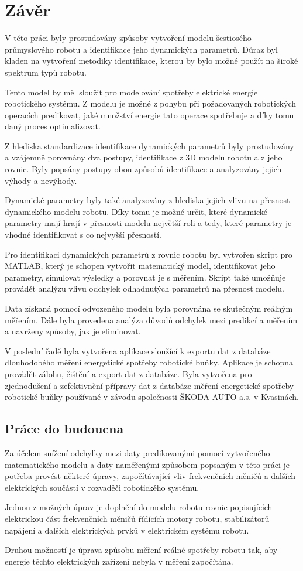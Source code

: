 \chapter{Závěr}

V této práci byly prostudovány způsoby vytvoření modelu šestiosého průmyslového robotu a identifikace jeho dynamických parametrů. Důraz byl kladen na vytvoření metodiky identifikace, kterou by bylo možné použít na široké spektrum typů robotu. 

Tento model by měl sloužit pro modelování spotřeby elektrické energie robotického systému. Z modelu je možné z pohybu při požadovaných robotických operacích predikovat, jaké množství energie tato operace spotřebuje a díky tomu daný proces optimalizovat.

Z hlediska standardizace identifikace dynamických parametrů byly prostudovány a vzájemně porovnány dva postupy, identifikace z 3D modelu robotu a z jeho rovnic. Byly popsány postupy obou způsobů identifikace a analyzovány jejich výhody a nevýhody. 

Dynamické parametry byly také analyzovány z hlediska jejich vlivu na přesnost dynamického modelu robotu. Díky tomu je možné určit, které dynamické parametry mají hrají v přesnosti modelu největší roli a tedy, které parametry je vhodné identifikovat s co nejvyšší přesností.

Pro identifikaci dynamických parametrů z rovnic robotu byl vytvořen skript pro MATLAB, který je schopen vytvořit matematický model, identifikovat jeho parametry, simulovat výsledky a porovnat je s měřením. Skript také umožňuje provádět analýzu vlivu odchylek odhadnutých parametrů na přesnost modelu. 

Data získaná pomocí odvozeného modelu byla porovnána se skutečným reálným měřením. Dále byla provedena analýza důvodů odchylek mezi predikcí a měřením a navrženy způsoby, jak je eliminovat.  

V poslední řadě byla vytvořena aplikace sloužící k exportu dat z databáze dlouhodobého měření energetické spotřeby robotické buňky. Aplikace je schopna provádět zálohu, čištění a export dat z databáze. Byla vytvořena pro zjednodušení a zefektivnění přípravy dat z databáze měření energetické spotřeby robotické buňky používané v závodu společnosti ŠKODA AUTO a.s. v Kvasinách. 

\section{Práce do budoucna}

Za účelem snížení odchylky mezi daty predikovanými pomocí vytvořeného matematického modelu a daty naměřenými způsobem popsaným v této práci je potřeba provést některé úpravy, započítávající vliv frekvenčních měničů a dalších elektrických součástí v rozvaděči robotického systému. 

Jednou z možných úprav je doplnění do modelu robotu rovnic popisujících elektrickou část frekvenčních měničů řídících motory robotu, stabilizátorů napájení a dalších elektrických prvků v elektrickém systému robotu.

Druhou možností je úprava způsobu měření reálné spotřeby robotu tak, aby energie těchto elektrických zařízení nebyla v měření započítána.